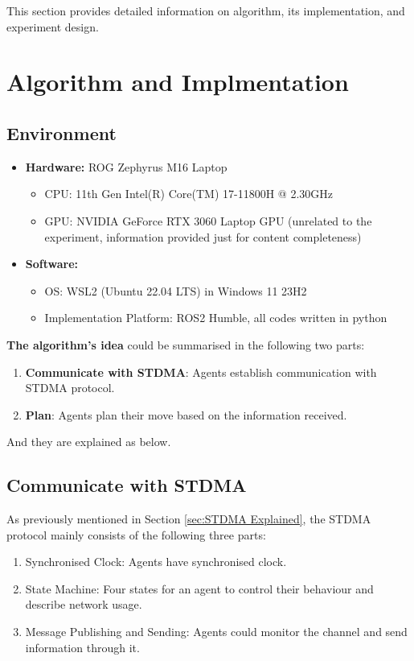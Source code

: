 This section provides detailed information on algorithm, its implementation, and experiment design.

\section{Algorithm and Implmentation}

\subsection*{Environment}

\begin{itemize}
    \item \textbf{Hardware:} ROG Zephyrus M16 Laptop
    \begin{itemize}
        \item CPU: 11th Gen Intel(R) Core(TM) 17-11800H @ 2.30GHz
        \item GPU: NVIDIA GeForce RTX 3060 Laptop GPU (unrelated to the experiment, information provided just for content completeness)
    \end{itemize}
    \item \textbf{Software:}
    \begin{itemize}
        \item OS: WSL2 (Ubuntu 22.04 LTS) in Windows 11 23H2
        \item Implementation Platform: ROS2 Humble, all codes written in python
    \end{itemize}
\end{itemize}


\textbf{The algorithm's idea} could be summarised in the following two parts: 
\begin{enumerate}
    \item \textbf{Communicate with STDMA}: Agents establish communication with STDMA protocol.
    \item \textbf{Plan}: Agents plan their move based on the information received.
\end{enumerate}

And they are explained as below.

\subsection{Communicate with STDMA}

As previously mentioned in Section \ref{sec:STDMA Explained}, the STDMA protocol mainly consists of the following three parts:
\begin{enumerate}
    \item Synchronised Clock: Agents have synchronised clock.
    \item State Machine: Four states for an agent to control their behaviour and describe network usage.
    \item Message Publishing and Sending: Agents could monitor the channel and send information through it.
\end{enumerate}

